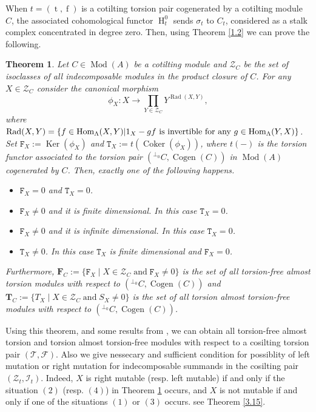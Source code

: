 \documentclass[12pt]{amsart}
\numberwithin{equation}{section}
\newtheorem{theorem}[lemma]{Theorem}
\theoremstyle{definition}
\DeclareMathOperator{\Mod}{Mod}
\DeclareMathOperator{\Hom}{Hom}
\DeclareMathOperator{\Ker}{Ker}
\DeclareMathOperator{\Coker}{Coker}
\DeclareMathOperator{\Cogen}{Cogen}
\DeclareMathOperator{\ts}{t}
\DeclareMathOperator{\fs}{f}
\DeclareMathOperator{\HH}{H}
\DeclareMathOperator{\Rad}{Rad}
\newtheorem*{theorem 0*}{Theorem}
\newtheorem*{theorem a*}{Theorem A}
\newtheorem*{theorem b*}{Theorem B}
\numberwithin{diagram}{section}
\begin{document}
When $t=(\ts,\fs)$ is a cotilting torsion pair cogenerated by a cotilting module $C$, the associated cohomological functor $\HH^0_t$ sends $\sigma_t$ to $C_t$, considered as a stalk complex concentrated in degree zero.
Then, using Theorem \ref{1.2} we can prove the following.
\begin{theorem}\label{1.3}
Let $C\in \Mod(A)$ be a cotilting module and $\mathcal{Z}_C$ be the set of isoclasses of all indecomposable modules in the product closure of $C$. For any $X\in\mathcal{Z}_C$ consider the canonical morphism
			\[\phi_X:X\longrightarrow \prod_{Y\in\mathcal{Z}_C}Y^{\Rad(X,Y)},\]
		where $\Rad(X,Y)=\{f\in \Hom_{\Lambda}(X, Y)|1_X-gf \space\text{ is invertible for any }\space  g\in\Hom_\Lambda(Y, X)\}$. Set $\mathtt{F}_X:=\Ker(\phi_X)$ and $\mathtt{T}_X:=t(\Coker(\phi_X))$, where $t(-)$ is the torsion functor associated to the torsion pair $({}^{\bot_0}C,\Cogen(C))$ in $\Mod(A)$ cogenerated by $C$.
	Then, exactly one of the following happens.
	\begin{itemize}
	\item[(1)]
	$\mathtt{F}_X=0$ and $\mathtt{T}_X=0$.
	\item[(2)]
	$\mathtt{F}_X\neq 0$ and it is finite dimensional. In this case $\mathtt{T}_X=0$.
	\item[(3)]
	$\mathtt{F}_X\neq 0$ and it is infinite dimensional. In this case $\mathtt{T}_X=0$.
	\item[(4)]
	$\mathtt{T}_X\neq 0$. In this case $\mathtt{T}_X$ is finite dimensional and $\mathtt{F}_X=0$.
	\end{itemize}
	 Furthermore, $\mathbf{F}_C:=\{\mathtt{F}_X\mid X\in\mathcal{Z}_C\; \text{and}\; \mathtt{F}_X\neq 0\}$ is the set of all torsion-free almost torsion modules with respect to $({}^{\bot_0}C,\Cogen(C))$ and $\mathbf{T}_C:=\{T_X\mid X\in\mathcal{Z}_C\; \text{and}\; S_X\neq 0\}$ is the set of all torsion almost torsion-free modules with respect to $({}^{\bot_0}C,\Cogen(C))$. 
\end{theorem} 
Using this theorem, and some results from \cite{ALS2}, we can obtain all torsion-free almost torsion and torsion almost torsion-free modules with respect to  a cosilting torsion pair $(\mathcal{T},\mathcal{F})$. Also we give nessecary and sufficient condition for possiblity of left mutation or right mutation for indecomposable summands in the cosilting pair $(\mathcal{Z}_t,\mathcal{I}_t)$. Indeed, $X$ is right mutable (resp. left mutable) if and only if the situation $(2)$ (resp. $(4)$) in Theorem \ref{1.3} occurs, and $X$ is not mutable if and only if one of the situations $(1)$ or $(3)$ occurs. see Theorem \ref{3.15}.
\end{document}
